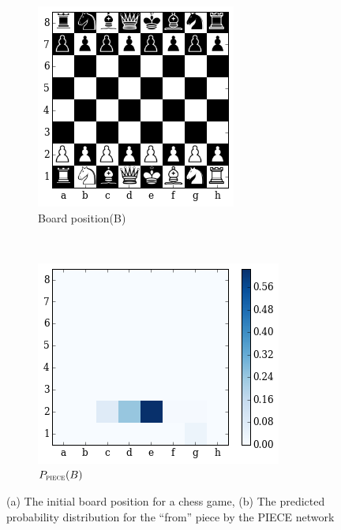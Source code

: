 \begin{figure}[H]
  \centering
    \begin{subfigure}[t]{0.5\textwidth}
        \centering
        
	\includegraphics[scale=0.7]{img/best_moves/output_17_0.png}
        \caption{Board position(B)}
        \label{figure:initialboarda}
    \end{subfigure}%
  ~
    \begin{subfigure}[t]{0.5\textwidth}
        \centering
        \includegraphics[width=\textwidth]{img/best_moves/output_12_0.png}
        \caption{$P_{\textsc{piece}}(B)$}
        \label{figure:initialboardb}
    \end{subfigure}
\caption[Predictions for initial board position]{
    (a) The initial board position for a chess game, 
    (b) The predicted probability distribution for the ``from'' piece by the 
\textsc{PIECE} network}
\label{figure:initialboard}
\end{figure}
